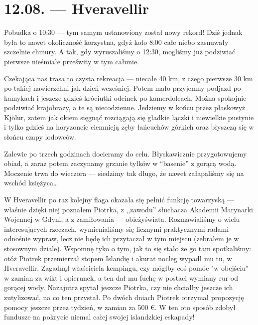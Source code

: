 \chapter*{12.08. --- Hveravellir}

Pobudka o 10:30 --- tym samym ustanowiony został nowy rekord! Dziś jednak była to nawet okoliczność korzystna, gdyż koło 8:00 całe niebo zasnuwały szczelnie chmury. A tak, gdy wyruszaliśmy o 12:30, mogliśmy już podziwiać pierwsze nieśmiałe prześwity w tym całunie.

Czekająca nas trasa to czysta rekreacja --- niecałe 40 km, z czego pierwsze 30 km po takiej nawierzchni jak dzień wcześniej. Potem mało przyjemny podjazd po kamykach i jeszcze gdzieś króciutki odcinek po kamerdolcach. Można spokojnie podziwiać krajobrazy, a te są niecodzienne. Jedziemy w końcu przez płaskowyż Kjölur, zatem jak okiem sięgnąć rozciągają się gładkie łączki i niewielkie pustynie i tylko gdzieś na horyzoncie ciemnieją zęby łańcuchów górkich oraz błyszczą się w słońcu czapy lodowców.

Zalewie po trzech godzinach docieramy do celu. Błyskawicznie przygotowujemy obiad, a zaraz potem  zaczynamy grzanie tyłków w “basenie” z gorącą wodą. Moczenie trwa do wieczora --- siedzimy tak długo, że nawet załapaliśmy się na wschód księżyca…

W Hveravellir po raz kolejny flaga okazała się pełnić funkcję towarzyską --- właśnie dzięki niej poznałem Piotrka, z ,,zawodu'' słuchacza Akademii Marynarki Wojennej w Gdyni, a z zamiłowania --- obieżyświata. Rozmawialiśmy o wielu interesujących rzeczach, wymienialiśmy się licznymi praktycznymi radami odnośnie wypraw, lecz nie będę ich przytaczał w tym miejscu (zebrałem je w stosownym dziale). Wspomnę tyko o tym, jak to się stało że go tam spotkaliśmy: otóż Piotrek przemierzał stopem Islandię i akurat nocleg wypadł mu tu, w Hveravellir. Zagadnął właściciela kempingu, czy mógłby coś pomóc "w obejściu" w zamian za wikt i opierunek, a ten dał mu fuchę w postaci wymiany rur od gorącej wody. Nazajutrz spytał jeszcze Piotrka, czy nie chciałby jeszcze ich zutylizować, na co ten przystał. Po dwóch dniach Piotrek otrzymał propozycję pomocy jeszcze przez tydzień, w zamian za 500 €. W ten oto sposób zdobył fundusze na pokrycie niemal całej swojej islandzkiej eskapady!



